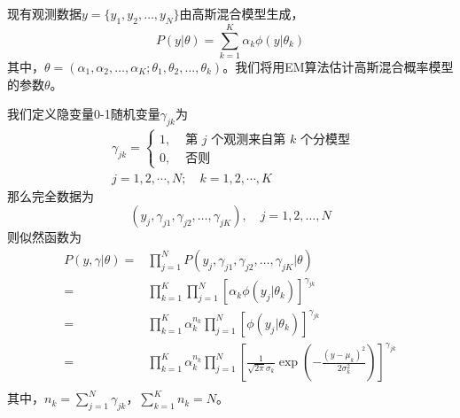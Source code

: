 \documentclass[lang=cn,11pt,a4paper,cite=authoryear]{elegantpaper}
\begin{document}
现有观测数据$y=\{y_1,y_2,\dots,y_N\}$由高斯混合模型生成，
\begin{equation}
P(y|\theta)=\sum_{k=1}^K\alpha_k\phi(y|\theta_k)
\end{equation}
其中，$\theta=(\alpha_1,\alpha_2,\dots,\alpha_K;\theta_1,\theta_2,\dots,\theta_k)$。我们将用EM算法估计高斯混合概率模型的参数$\theta$。

我们定义隐变量0-1随机变量$\gamma_{jk}$为
\begin{equation}
\begin{aligned}
	&\gamma_{j k}= \begin{cases}1, & \text { 第 } j \text { 个观测来自第 } k \text { 个分模型 } \\
		0, & \text { 否则 }\end{cases} \\
	&j=1,2, \cdots, N ; \quad k=1,2, \cdots, K
\end{aligned}
\end{equation}
那么完全数据为
\begin{equation}
(y_j,\gamma_{j1},\gamma_{j2},\dots,\gamma_{jK}),  \quad j=1,2,\dots,N
\end{equation}
则似然函数为
\begin{equation}
\begin{aligned}
	P(y,\gamma|\theta)=&\prod_{j=1}^NP(y_j,\gamma_{j1},\gamma_{j2},\dots,\gamma_{jK}|\theta)\\
	=&\prod_{k=1}^K\prod_{j=1}^N[\alpha_k\phi(y_j|\theta_k)]^{\gamma_{jk}}\\
	=&\prod_{k=1}^K\alpha_k^{n_k}\prod_{j=1}^N[\phi(y_j|\theta_k)]^{\gamma_{jk}}\\
	=&\prod_{k=1}^K\alpha_k^{n_k}\prod_{j=1}^N[\frac{1}{\sqrt{2\pi}\sigma_k}\exp(-\frac{(y-\mu_k)^2}{2\sigma_k^2})]^{\gamma_{jk}}\\
\end{aligned}
\end{equation}
其中，$n_k=\sum\limits_{j=1}^N\gamma_{jk}$，$\sum\limits_{k=1}^Kn_k=N$。
\end{document}
